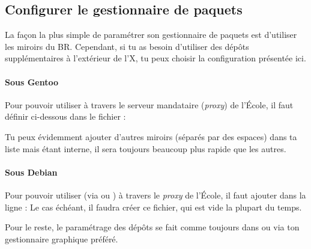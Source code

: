 \subsection{Configurer le gestionnaire de paquets}

La fa\c con la plus simple de param\'etrer son gestionnaire de paquets est d'utiliser les miroirs du BR. Cependant, si tu as besoin d'utiliser des d\'ep\^ots suppl\'ementaires \`a l'ext\'erieur de l'X, tu peux choisir
la configuration pr\'esent\'ee ici.

\paragraph{Sous Gentoo}
\label{gentoo_mirror} Pour pouvoir utiliser  \`a  travers le serveur mandataire (\emph{proxy}) de l'\'Ecole, il faut d\'efinir %
ci-dessous dans le fichier  :

Tu peux \'evidemment ajouter d'autres miroirs (s\'epar\'es par des espaces) dans ta liste mais  \'etant interne, il sera toujours beaucoup plus rapide que les autres.



\paragraph{Sous Debian}
\label{debian_mirror} Pour pouvoir utiliser  (via  ou ) \`a travers le \emph{proxy} de l'\'Ecole, il faut ajouter dans  la ligne :
Le cas \'ech\'eant, il faudra cr\'eer ce fichier, qui est vide la plupart du temps.

Pour le reste, le param\'etrage des d\'ep\^ots se fait comme toujours dans  ou via ton gestionnaire graphique pr\'ef\'er\'e.
